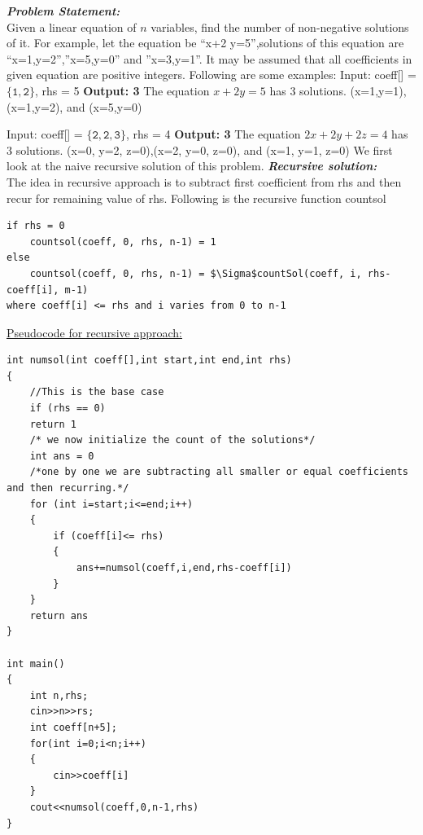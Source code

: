 \documentclass[12pt]{book}
\begin{document}
\textbf{\textit{Problem Statement:}}\\
Given a linear equation of $n$ variables, find the number of non-negative solutions of it. For example, let the equation be “x+2 y=5”,solutions of this equation are “x=1,y=2”,”x=5,y=0” and ”x=3,y=1”. It may be assumed that all coefficients in given equation are positive integers.\newline\newline
Following are some examples:\newline\newline
Input: coeff[] = $\mathtt{\{1, 2\}}$, rhs = 5\newline
\textbf{Output: 3}\newline\newline
The equation $x + 2y = 5$ has 3 solutions.\newline
(x=1,y=1), (x=1,y=2), and (x=5,y=0)\newline

Input: coeff[] = $\mathtt{\{2, 2, 3\}}$, rhs = 4\newline
\textbf{Output: 3}\newline\newline
The equation $2x + 2y + 2z = 4$ has 3 solutions.\newline
(x=0, y=2, z=0),(x=2, y=0, z=0), and (x=1, y=1, z=0)\newline
\newline
We first look at the naive recursive solution of this problem.\newline\newline
\textbf{\textit{Recursive solution:}}\\
The idea in recursive approach is to subtract first coefficient from rhs and then recur for remaining value of rhs.\newline\newline
Following is the recursive function countsol\newline

\begin{lstlisting}[mathescape]
if rhs = 0 
    countsol(coeff, 0, rhs, n-1) = 1
else 
    countsol(coeff, 0, rhs, n-1) = $\Sigma$countSol(coeff, i, rhs-coeff[i], m-1) 
where coeff[i] <= rhs and i varies from 0 to n-1
\end{lstlisting}

\underline{Pseudocode for recursive approach:}\\
\newline
\begin{lstlisting}
int numsol(int coeff[],int start,int end,int rhs)
{
    //This is the base case
    if (rhs == 0)
    return 1
    /* we now initialize the count of the solutions*/
    int ans = 0
    /*one by one we are subtracting all smaller or equal coefficients and then recurring.*/
    for (int i=start;i<=end;i++)
    {
        if (coeff[i]<= rhs)
        {
            ans+=numsol(coeff,i,end,rhs-coeff[i])
        }
    }
    return ans
}

int main()
{
    int n,rhs;
    cin>>n>>rs;
	int coeff[n+5];
    for(int i=0;i<n;i++)
    {
        cin>>coeff[i]
    }
    cout<<numsol(coeff,0,n-1,rhs)
}
\end{lstlisting}
\end{document}
